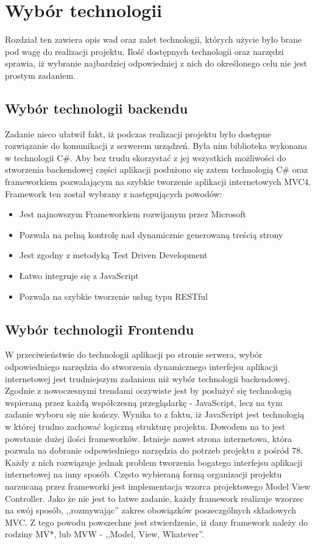 \chapter{Wybór technologii}

Rozdział ten zawiera opis wad oraz zalet technologii, których użycie było brane pod wagę do realizacji projektu. Ilość dostępnych technologii oraz narzędzi sprawia, iż wybranie najbardziej odpowiedniej z nich do określonego celu nie jest prostym zadaniem.

\section{Wybór technologii backendu}

Zadanie nieco ułatwił fakt, iż podczas realizacji projektu było dostępne rozwiązanie do komunikacji z serwerem urządzeń. Była nim biblioteka wykonana w technologii C\#. Aby bez trudu skorzystać z jej wszystkich możliwości do stworzenia backendowej części aplikacji posłużono się zatem technologią C\# oraz frameworkiem pozwalającym na szybkie tworzenie aplikacji internetowych MVC4. Framework ten został wybrany z następujących powodów\cite{mvc-book}:

\begin{itemize}
\item Jest najnowszym Frameworkiem rozwijanym przez Microsoft
\item Pozwala na pełną kontrolę nad dynamicznie generowaną treścią strony
\item Jest zgodny z metodyką Test Driven Development
\item Łatwo integruje się z JavaScript
\item Pozwala na szybkie tworzenie usług typu RESTful
\end{itemize}


\section{Wybór technologii Frontendu}

W przeciwieństwie do technologii aplikacji po stronie serwera, wybór odpowiedniego narzędzia do stworzenia dynamicznego interfejsu aplikacji internetowej jest trudniejszym zadaniem niż wybór technologii backendowej. Zgodnie z nowoczesnymi trendami oczywiste jest by posłużyć się technologią wspieraną przez każdą współczesną przeglądarkę - JavaScript\cite{javascript-book}, lecz na tym zadanie wyboru się nie kończy. Wynika to z faktu, iż JavaScript jest technologią w której trudno zachować logiczną strukturę projektu. Dowodem na to jest powstanie dużej ilości frameworków. Istnieje nawet strona internetowa, która pozwala na dobranie odpowiedniego narzędzia do potrzeb projektu z pośród 78\cite{todomvc}. Każdy z nich rozwiązuje jednak problem tworzenia bogatego interfejsu aplikacji internetowej na inny sposób. Często wybieraną formą organizacji projektu narzucaną przez frameworki jest implementacja wzorca projektowego Model View Controller. Jako że nie jest to łatwe zadanie, każdy framework realizuje wzorzec na swój sposób, ,,rozmywając'' zakres obowiązków poszeczgólnych składowych MVC. Z tego powodu powszechne jest stwierdzenie, iż dany framework należy do rodziny MV*, lub MVW - ,,Model, View, Whatever''. 
	
